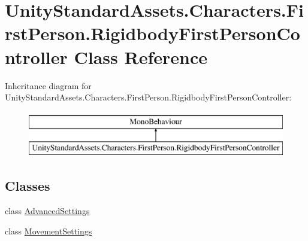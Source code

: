 \hypertarget{class_unity_standard_assets_1_1_characters_1_1_first_person_1_1_rigidbody_first_person_controller}{}\section{Unity\+Standard\+Assets.\+Characters.\+First\+Person.\+Rigidbody\+First\+Person\+Controller Class Reference}
\label{class_unity_standard_assets_1_1_characters_1_1_first_person_1_1_rigidbody_first_person_controller}
Inheritance diagram for Unity\+Standard\+Assets.\+Characters.\+First\+Person.\+Rigidbody\+First\+Person\+Controller\+:\begin{figure}[H]
\begin{center}
\leavevmode
\includegraphics[height=2.000000cm]{class_unity_standard_assets_1_1_characters_1_1_first_person_1_1_rigidbody_first_person_controller}
\end{center}
\end{figure}
\subsection*{Classes}
\begin{DoxyCompactItemize}
\item 
class \hyperlink{class_unity_standard_assets_1_1_characters_1_1_first_person_1_1_rigidbody_first_person_controller_1_1_advanced_settings}{Advanced\+Settings}
\item 
class \hyperlink{class_unity_standard_assets_1_1_characters_1_1_first_person_1_1_rigidbody_first_person_controller_1_1_movement_settings}{Movement\+Settings}
\end{DoxyCompactItemize}
